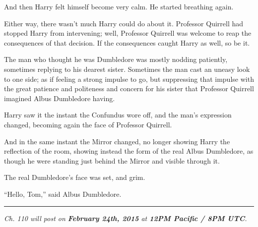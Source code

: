 And then Harry felt himself become very calm. He started breathing again.

Either way, there wasn't much Harry could do about it. Professor Quirrell had stopped Harry from intervening; well, Professor Quirrell was welcome to reap the consequences of that decision. If the consequences caught Harry as well, so be it.

The man who thought he was Dumbledore was mostly nodding patiently, sometimes replying to his dearest sister. Sometimes the man cast an uneasy look to one side; as if feeling a strong impulse to go, but suppressing that impulse with the great patience and politeness and concern for his sister that Professor Quirrell imagined Albus Dumbledore having.

Harry saw it the instant the Confundus wore off, and the man's expression changed, becoming again the face of Professor Quirrell.

And in the same instant the Mirror changed, no longer showing Harry the reflection of the room, showing instead the form of the real Albus Dumbledore, as though he were standing just behind the Mirror and visible through it.

The real Dumbledore's face was set, and grim.

``Hello, Tom,'' said Albus Dumbledore.

\begin{center}\rule{3in}{0.4pt}\end{center}

\emph{Ch. 110 will post on \textbf{February 24th, 2015} at \textbf{12PM Pacific / 8PM UTC}.}
